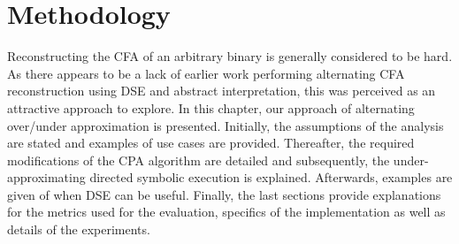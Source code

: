 \documentclass{kththesis}
\newcommand{\fbcomment}[1]{{#1}}
\renewcommand{\fbcomment}[1]{}
\begin{document}
\chapter{Methodology}\label{chap:methodlogy}
\fbcomment{\color{red}Goal: Describe what has been done and why.}
%
Reconstructing the CFA of an arbitrary binary is generally considered to be hard\cite{Jakstab}. As there appears to be a lack of earlier work performing alternating CFA reconstruction using DSE and abstract interpretation, this was perceived as an attractive approach to explore. In this chapter, our approach of alternating over/under approximation is presented. Initially, the assumptions of the analysis are stated and examples of use cases are provided. Thereafter, the required modifications of the CPA algorithm are detailed and subsequently, the under-approximating directed symbolic execution is explained. Afterwards, examples are given of when DSE can be useful. Finally, the last sections provide explanations for the metrics used for the evaluation, specifics of the implementation as well as details of the experiments.
\end{document}
